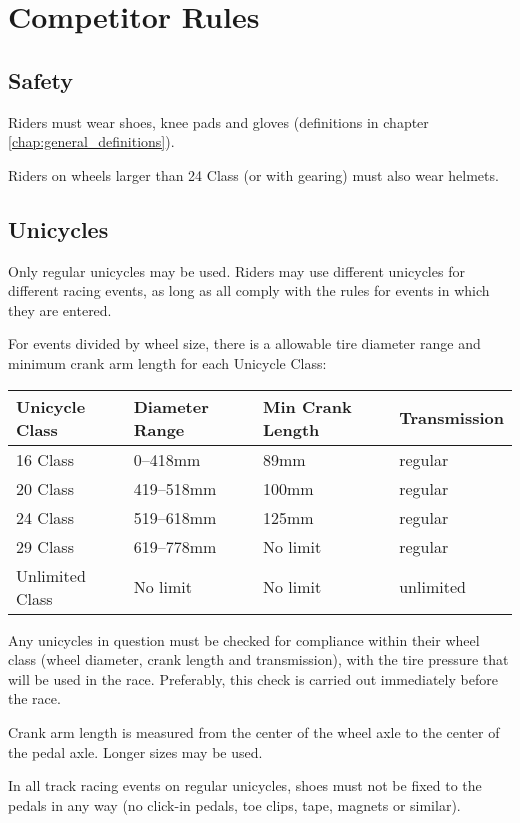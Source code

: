 \chapter{Competitor Rules}

\section{Safety}

Riders must wear shoes, knee pads and gloves (definitions in chapter \ref{chap:general_definitions}).

Riders on wheels larger than 24 Class (or with gearing) must also wear helmets.

\section{Unicycles}

Only regular unicycles may be used.
Riders may use different unicycles for different racing events, as long as all comply with the rules for events in which they are entered.

For events divided by wheel size, there is a allowable tire diameter range and minimum crank arm length for each Unicycle Class:

\begin{longtable}{|p{3cm}|p{3.5cm}|p{4cm}|p{3cm}|}
\hline
\textbf{Unicycle Class} & \textbf{Diameter Range} & \textbf{Min Crank Length} & \textbf{Transmission}\\
\hline
16 Class & 0--418mm & 89mm & regular \\
\hline
20 Class & 419--518mm & 100mm & regular \\
\hline
24 Class & 519--618mm & 125mm & regular \\
\hline
29 Class & 619--778mm & No limit & regular \\
\hline
Unlimited Class & No limit & No limit & unlimited \\
\hline
\end{longtable}

Any unicycles in question must be checked for compliance within their wheel class (wheel diameter, crank length and transmission), with the tire pressure that will be used in the race.
Preferably, this check is carried out immediately before the race.

Crank arm length is measured from the center of the wheel axle to the center of the pedal axle.
Longer sizes may be used.

In all track racing events on regular unicycles, shoes must not be fixed to the pedals in any way (no click-in pedals, toe clips, tape, magnets or similar).

